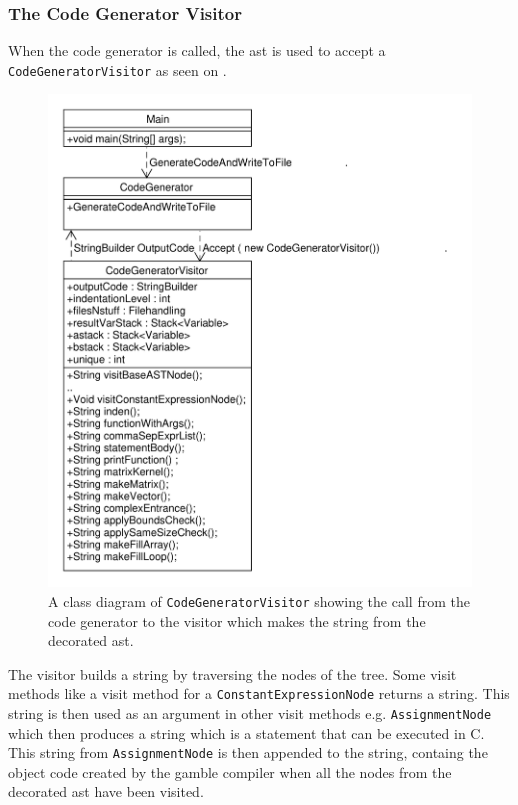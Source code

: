 \subsubsection*{The Code Generator Visitor}
When the code generator is called, the \acrshort{ast} is used to accept a \texttt{CodeGeneratorVisitor} as seen on .

\begin{figure}[!ht]
\centering
 \includegraphics[width=1\textwidth]{figures/ClassDiagrams/CodeGeneratorCall.pdf} %
\caption{A class diagram of \texttt{CodeGeneratorVisitor} showing the call from the code generator to the visitor which makes the string from the decorated \acrshort{ast}.}\label{fig:CodeGeneratorVisitor}
\vspace{-15pt}
\end{figure}

The visitor builds a string by traversing the nodes of the tree.
Some visit methods like a visit method for a \texttt{ConstantExpressionNode} returns a string.
This string is then used as an argument in other visit methods e.g. \texttt{AssignmentNode} which then produces a string which is a statement that can be executed in C.
This string from \texttt{AssignmentNode} is then appended to the string, containg the object code created by the \gls{gamble} compiler when all the nodes from the decorated \acrshort{ast} have been visited.

